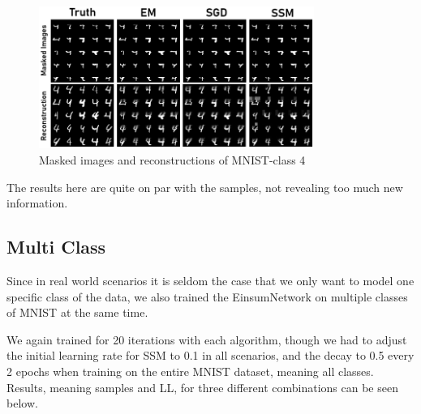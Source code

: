 \begin{figure}[H]
    \centering
    \includegraphics[width=0.8\textwidth]{figures/einsum/mnist/reconstructions_4.png}
    \caption{Masked images and reconstructions of MNIST-class 4}
\end{figure}

The results here are quite on par with the samples, not revealing too much 
new information.

\subsection{Multi Class}
\label{sec:exp_mnist_multi}

Since in real world scenarios it is seldom the case that we only want to model one specific 
class of the data, we also trained the EinsumNetwork
on multiple classes of MNIST at the same time.

We again trained for 20 iterations with each algorithm, though we had to adjust the initial learning rate for SSM 
to 0.1 in all scenarios, and the decay to 0.5 every 2 epochs when training on the entire MNIST dataset, meaning all classes.
Results, meaning samples and LL, for three different combinations can be seen below. \\

